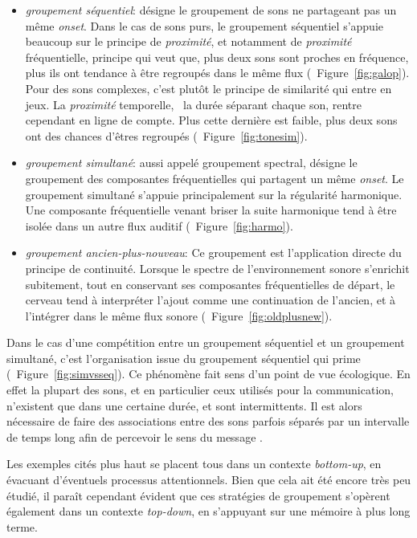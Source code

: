 \begin{itemize}
\item \emph{groupement séquentiel}: désigne le groupement de sons ne partageant pas un même \emph{onset}. Dans le cas de sons purs, le groupement séquentiel s'appuie beaucoup sur le principe de \emph{proximité}, et notamment de \emph{proximité} fréquentielle, principe qui veut que, plus deux sons sont proches en fréquence, plus ils ont tendance à être regroupés dans le même flux (\Cf~Figure~\ref{fig:galop}). Pour des sons complexes, c'est plutôt le principe de similarité qui entre en jeux. La \emph{proximité} temporelle, \ie~la durée séparant chaque son, rentre cependant en ligne de compte. Plus cette dernière est faible, plus deux sons ont des chances d'êtres regroupés (\Cf~Figure~\ref{fig:tonesim}).
\item \emph{groupement simultané}: aussi appelé groupement spectral, désigne le groupement des composantes fréquentielles qui partagent un même \emph{onset}. Le groupement simultané s'appuie principalement sur la régularité harmonique. Une composante fréquentielle venant briser la suite harmonique tend à être isolée dans un autre flux auditif (\Cf~Figure~\ref{fig:harmo}).
\item \emph{groupement ancien-plus-nouveau}: Ce groupement est l'application directe du principe de continuité. Lorsque le spectre de l'environnement sonore s'enrichit subitement, tout en conservant ses composantes fréquentielles de départ, le cerveau tend à interpréter l'ajout comme une continuation de l'ancien, et à l'intégrer dans le même flux sonore (\Cf~Figure~\ref{fig:oldplusnew}).
\end{itemize}

Dans le cas d'une compétition entre un groupement séquentiel et un groupement simultané, c'est l'organisation issue du groupement séquentiel qui prime (\Cf~Figure~\ref{fig:simvsseq}). Ce phénomène fait sens d'un point de vue écologique. En effet la plupart des sons, et en particulier ceux utilisés pour la communication, n'existent que dans une certaine durée, et sont intermittents. Il est alors nécessaire de faire des associations entre des sons parfois séparés par un intervalle de temps long afin de percevoir le sens du message \citep{winkler2009modeling}.

Les exemples cités plus haut se placent tous dans un contexte \emph{bottom-up}, en évacuant d'éventuels processus attentionnels. Bien que cela ait été encore très peu étudié, il paraît cependant évident que ces stratégies de groupement s’opèrent également dans un contexte \emph{top-down}, en s'appuyant sur une mémoire à plus long terme.

